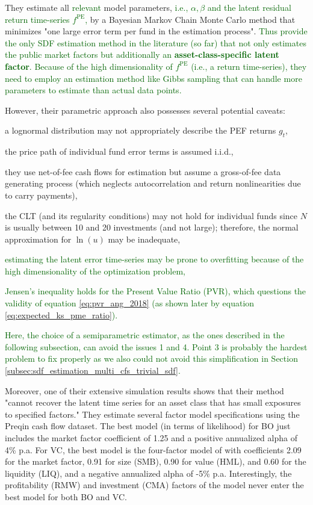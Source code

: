 They estimate all \textcolor{darkgreen}{relevant} model parameters, \textcolor{darkgreen}{i.e., $\alpha,\beta$ and the latent residual return time-series $f^{\mathrm{PE}}$,} by a Bayesian Markov Chain Monte Carlo method that minimizes "one large error term per fund in the estimation process".
\textcolor{darkgreen}{
	Thus \cite{ACGP18} provide the only SDF estimation method in the literature (so far) that not only estimates the public market factors but additionally an \textbf{asset-class-specific latent factor}.
	Because of the high dimensionality of $f^{\mathrm{PE}}$ (i.e., a return time-series), they need to employ an estimation method like Gibbs sampling that can handle more parameters to estimate than actual data points.
}

However, their parametric approach also possesses several potential caveats:
\begin{enumerate}
	\item a lognormal distribution may not appropriately describe the PEF returns $g_t$,
	\item the price path of individual fund error terms is assumed i.i.d.,
	\item they use net-of-fee cash flows for estimation but assume a gross-of-fee data generating process (which neglects autocorrelation and return nonlinearities due to carry payments),
	\item the CLT (and its regularity conditions) may not hold for individual funds since $N$ is usually between 10 and 20 investments (and not large); therefore, the normal approximation for $\ln (u)$ may be inadequate, 
	\textcolor{darkgreen}{
		\item estimating the latent error time-series may be prone to overfitting because of the high dimensionality of the optimization problem,
		\item Jensen's inequality holds for the Present Value Ratio (PVR), which questions the validity of equation \ref{eq:pvr_ang_2018} (as shown later by equation \ref{eq:expected_ks_pme_ratio}).
	}
\end{enumerate}
\textcolor{darkgreen}{
	Here, the choice of a semiparametric estimator, as the ones described in the following subsection, can avoid the issues 1 and 4.
	Point 3 is probably the hardest problem to fix properly as we also could not avoid this simplification in Section \ref{subsec:sdf_estimation_multi_cfs_trivial_sdf}.
}

Moreover, one of their extensive simulation results shows that their method "cannot recover the latent time series for an asset class that has small exposures to specified factors."
They estimate several factor model specifications using the Preqin cash flow dataset.
The best model (in terms of likelihood) for BO just includes the market factor coefficient of 1.25 and a positive annualized alpha of 4\% p.a.
For VC, the best model is the four-factor model of \cite{PS03} with coefficients 2.09 for the market factor, 0.91 for size (SMB), 0.90 for value (HML), and 0.60 for the liquidity (LIQ), and a negative annualized alpha of -5\% p.a.
Interestingly, the profitability (RMW) and investment (CMA) factors of the \cite{FF15} model never enter the best model for both BO and VC.



